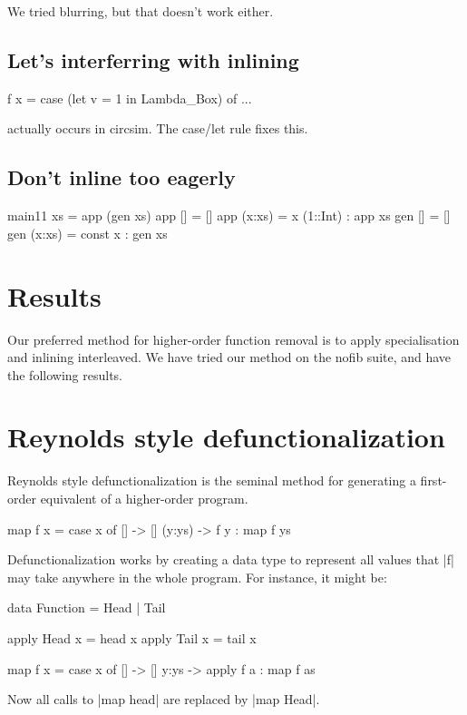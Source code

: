 \documentclass[preprint]{sigplanconf}
\begin{document}
We tried blurring, but that doesn't work either.

\subsection{Let's interferring with inlining}

\begin{code}
f x = case (let v = 1 in Lambda_Box) of ...
\end{code}

actually occurs in circsim. The case/let rule fixes this.

\subsection{Don't inline too eagerly}

\begin{code}
main11 xs = app (gen xs)
app [] = []
app (x:xs) = x (1::Int) : app xs
gen [] = []
gen (x:xs) = const x : gen xs
\end{code}



\section{Results}

Our preferred method for higher-order function removal is to apply specialisation and inlining interleaved. We have tried our method on the nofib suite, and have the following results.


\section{Reynolds style defunctionalization}

Reynolds style defunctionalization \cite{reynolds:defunc} is the seminal method for generating a first-order equivalent of a higher-order program.

\begin{example}
\begin{code}
map f x = case  x of
                []      -> []
                (y:ys)  -> f y : map f ys
\end{code}

\noindent Defunctionalization works by creating a data type to represent all values that |f| may take anywhere in the whole program. For instance, it might be:

\begin{code}
data Function = Head | Tail

apply Head  x = head  x
apply Tail  x = tail  x

map f x = case  x of
                []    -> []
                y:ys  -> apply f a : map f as
\end{code}

\noindent Now all calls to |map head| are replaced by |map Head|.
\end{example}
\end{document}

